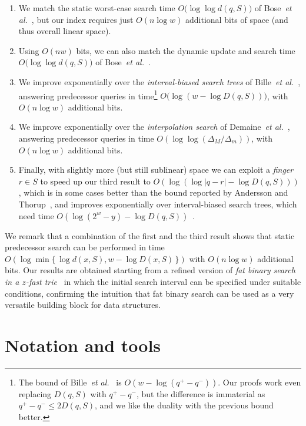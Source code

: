 \documentclass[a4paper,11pt]{article}
\newcommand{\etal}{\emph{et al.}\xspace}
\newcommand{\?}{\mskip1.5mu}
\begin{document}
\begin{enumerate}
  \item We match the static worst-case search time 
  $O\big(\log\log d(q, S)\big)$
  of Bose~\etal~\cite{BoseDoDuHoMo13}, but our index requires 
  just $O(n\log w)$ additional bits of space (and thus overall 
  linear space).
  \item Using $O(nw)$ bits, we can also match the dynamic
  update and search time $O\big(\log\log d(q, S)\big)$
  of Bose~\etal~\cite{BoseDoDuHoMo13}.
  \item We improve exponentially over the \emph{interval-biased search
  trees} of Bille~\etal~\cite{BilleLaRaSaSaWe15}, answering 
  predecessor queries in time\footnote{The
  bound of Bille~\etal~\cite{BilleLaRaSaSaWe15} is 
  $O(w - \log(q^+ - q^-))$. Our 
  proofs work even replacing $D(q, S)$ with $q^+ - q^-$, but 
  the difference is immaterial as $q^+ - q^-\leq 2D(q, S)$, and 
  we like the duality with the previous bound better.} 
  $O\big(\log(w - \log D(q, S))\big)$, with 
  $O(n\log w)$ additional bits.
  \item We improve exponentially over the \emph{interpolation
  search} of Demaine~\etal~\cite{DemaineJoPa04}, answering
  predecessor queries in time 
  $O\left(\log\log(\Delta_M / \Delta_m)\right)$, with
  $O(n\log w)$ additional bits.
  \item Finally, with slightly more (but still sublinear) space 
  we can exploit a \emph{finger} $r \in S$ to speed up our third 
  result to $O\left(\log(\log|q - r| - \log D(q, S))\right)$, which is in
  some cases better than the bound reported
  by Andersson and Thorup~\cite{AnderssonTh07}, and improves 
  exponentially over interval-biased search trees, which need 
  time  
  $O\left(\log(2^w - y) - \log D(q, S)\right)$~\cite{BilleLaRaSaSaWe15}.
\end{enumerate}
We remark that a combination of the first
and the third result shows that static predecessor 
search can be performed in time  
$O\left(\log \min \{\,\log d(x,S),w-\log D(x,S)\,\}\right)$ 
with $O(n \log w)$ additional bits. Our 
results are obtained starting from a refined version of
\emph{fat binary search in a $z$-fast trie}~\cite{BelazzouguiBoPaVi09} 
in which the initial search interval can be specified under 
suitable conditions, confirming the intuition that fat
binary search can be used as a very versatile building block 
for data structures.

\section{Notation and tools}
\label{sec:notation}
\end{document}
